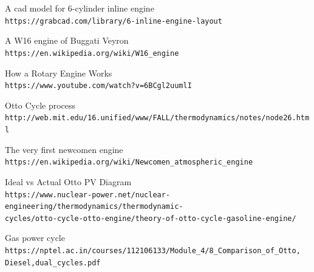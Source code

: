 \documentclass[11pt]{article}
\begin{document}
\begin{thebibliography}{9}
A cad model for 6-cylinder inline engine\\
\texttt{https://grabcad.com/library/6-inline-engine-layout}

A W16 engine of Buggati Veyron\\
\texttt{https://en.wikipedia.org/wiki/W16_engine}

How a Rotary Engine Works\\
\texttt{https://www.youtube.com/watch?v=6BCgl2uumlI}

 Otto Cycle process
\\\texttt{http://web.mit.edu/16.unified/www/FALL/thermodynamics/notes/node26.html}

The very first newcomen engine\\
\texttt{https://en.wikipedia.org/wiki/Newcomen\_atmospheric\_engine}

Ideal vs Actual Otto PV Diagram\\
\texttt{https://www.nuclear-power.net/nuclear-engineering/thermodynamics/thermodynamic-\\cycles/otto-cycle-otto-engine/theory-of-otto-cycle-gasoline-engine/}

Gas power cycle \\
\texttt{https://nptel.ac.in/courses/112106133/Module\_4/8\_Comparison\_of\_Otto,\\Diesel,dual\_cycles.pdf}

\end{thebibliography}
\end{document}
